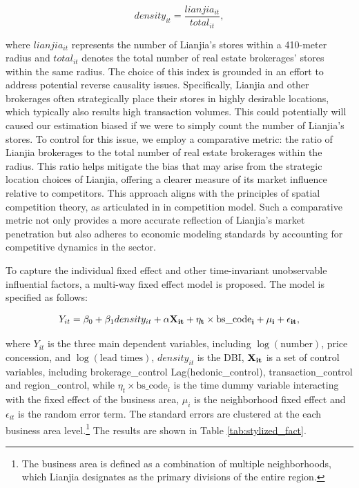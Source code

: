 \documentclass[11pt]{article}
\begin{document}
\begin{equation*}
  density_{it} = \frac{lianjia_{it}}{total_{it}},
\end{equation*}

where $lianjia_{it}$ represents the number of Lianjia's stores within a 410-meter radius and $total_{it}$ denotes the total number of real estate brokerages' stores within the same radius. The choice of this index is grounded in an effort to address potential reverse causality issues. Specifically, Lianjia and other brokerages often strategically place their stores in highly desirable locations, which typically also results high transaction volumes. This could potentially will caused our estimation biased if we were to simply count the number of Lianjia's stores. To control for this issue, we employ a comparative metric: the ratio of Lianjia brokerages to the total number of real estate brokerages within the radius. This ratio helps mitigate the bias that may arise from the strategic location choices of Lianjia, offering a clearer measure of its market influence relative to competitors. This approach aligns with the principles of spatial competition theory, as articulated in \citep{hotelling_stability_1929, daspremont_hotellings_1979} in competition model. Such a comparative metric not only provides a more accurate reflection of Lianjia's market penetration but also adheres to economic modeling standards by accounting for competitive dynamics in the sector.

To capture the individual fixed effect and other time-invariant unobservable influential factors, a multi-way fixed effect model is proposed. The model is specified as follows: 

\begin{equation}
  Y_{it} = \beta_0 + \beta_1 density_{it} + \bf{\alpha} \bf{X}_{it} + \eta_{t} \times \text{bs\_code}_i + \mu_i + \epsilon_{it}, \label{eq:multi-way-fe}
\end{equation}

where $Y_{it}$ is the three main dependent variables, including $\log(\text{number})$, price concession, and $\log(\text{lead times})$, $density_{it}$ is the DBI, $\bf{X}_{it}$ is a set of control variables, including brokerage\_control Lag(hedonic\_control), transaction\_control and region\_control, while $\eta_{t} \times \text{bs\_code}_i$ is the time dummy variable interacting with the fixed effect of the business area, $\mu_i$ is the neighborhood fixed effect and $\epsilon_{it}$ is the random error term. The standard errors are clustered at the each business area level.\footnote{The business area is defined as a combination of multiple neighborhoods, which Lianjia designates as the primary divisions of the entire region.} The results are shown in Table \ref{tab:stylized_fact}.
\end{document}
